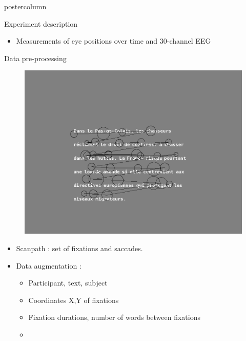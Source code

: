 \documentclass[final,hyperref={pdfpagelabels=false}]{beamer}
\begin{document}
\begin{frame}
\begin{columns}
\begin{column}{.49\textwidth}
\begin{beamercolorbox}[center,wd=\textwidth]{postercolumn}
\begin{minipage}[T]{.95\textwidth}
{\begin{block}{Experiment description}
                \begin{itemize}
                    \item Measurements of eye positions over time and 30-channel EEG
                \end{itemize}

            \end{block}
            \vfill
            \begin{block}{Data pre-processing}
                \begin{figure}[h]
                    \centering
                    \includegraphics[width=35cm]{s4t9bl.png}
                \end{figure}
                \begin{itemize}
                    \item Scanpath : set of fixations and saccades.
                    \item Data augmentation :
                    \begin{itemize}
                        \item Participant, text, subject
                        \item Coordinates X,Y of fixations
                        \item Fixation durations, number of words between fixations
                        \item  
                    \end{itemize}
                \end{itemize}
            \end{block}
            \vfill
          }
        \end{minipage}
      \end{beamercolorbox}
    \end{column}


\end{columns}
\end{frame}
\end{document}
